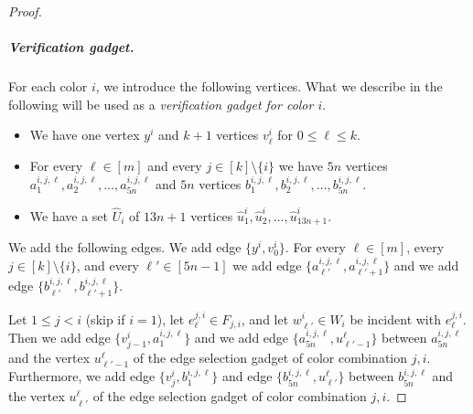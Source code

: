 \documentclass[a4paper,UKenglish,cleveref, autoref, thm-restate]{lipics-v2021}
\begin{document}
\begin{proof}
    
    \subparagraph{Verification gadget.} For each color $i$, we introduce the following vertices. What we describe in the following will be used as a \emph{verification gadget for color $i$}.
    \begin{itemize}
        \item We have one vertex $y^i$ and $k+1$ vertices $v^i_\ell$ for $0\le \ell\le k$.
        \item For every $\ell\in[m]$ and every $j\in[k]\setminus\{i\}$ we have $5n$ vertices $a^{i,j,\ell}_1,a^{i,j,\ell}_2,\ldots,a^{i,j,\ell}_{5n}$ and $5n$ vertices $b^{i,j,\ell}_1,b^{i,j,\ell}_2,\ldots,b^{i,j,\ell}_{5n}$.
        \item We have a set $\hat{U}_i$ of $13n+1$ vertices $\hat{u}^i_1,\hat{u}^i_2,\ldots,\hat{u}^i_{13n+1}$.
    \end{itemize}
    We add the following edges. We add edge $\{y^i,v^i_0\}$.
    For every $\ell\in[m]$, every $j\in[k]\setminus\{i\}$, and every $\ell'\in[5n-1]$ we add edge $\{a^{i,j,\ell}_{\ell'},a^{i,j,\ell}_{\ell'+1}\}$ and we add edge $\{b^{i,j,\ell}_{\ell'},b^{i,j,\ell}_{\ell'+1}\}$.
    
    Let $1\le j<i$ (skip if $i=1$), let $e_\ell^{j,i}\in F_{j,i}$, and let $w^i_{\ell'}\in W_i$ be incident with $e_\ell^{j,i}$. Then we add edge $\{v_{j-1}^i,a^{i,j,\ell}_{1}\}$ and we add edge $\{a^{i,j,\ell}_{5n},u^\ell_{\ell'-1}\}$ between $a^{i,j,\ell}_{5n}$ and the vertex $u^\ell_{\ell'-1}$ of the edge selection gadget of color combination $j,i$.
    Furthermore, we add edge $\{v_{j}^i,b^{i,j,\ell}_{1}\}$ and edge $\{b^{i,j,\ell}_{5n},u^\ell_{\ell'}\}$ between $b^{i,j,\ell}_{5n}$ and the vertex $u^\ell_{\ell'}$ of the edge selection gadget of color combination $j,i$.


\end{proof}
\end{document}
